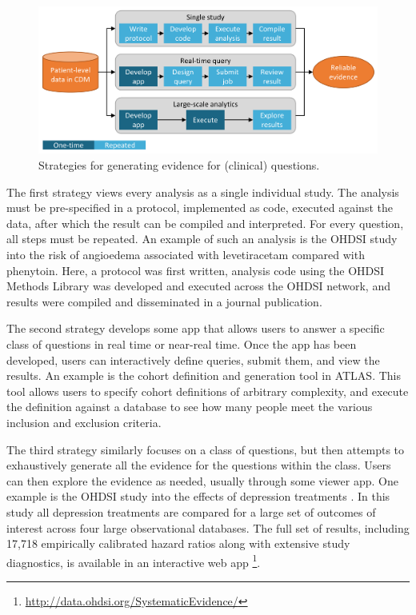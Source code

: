 \documentclass[11pt]{book}
\let\rmarkdownfootnote\footnote%
\def\footnote{\protect\rmarkdownfootnote}
\begin{document}
\begin{figure}

{\centering \includegraphics[width=0.9\linewidth]{images/OhdsiAnalyticsTools/strategies} 

}

\caption{Strategies for generating evidence for (clinical) questions.}\label{fig:strategies}
\end{figure}

The first strategy views every analysis as a single individual study.
The analysis must be pre-specified in a protocol, implemented as code,
executed against the data, after which the result can be compiled and
interpreted. For every question, all steps must be repeated. An example
of such an analysis is the OHDSI study into the risk of angioedema
associated with levetiracetam compared with phenytoin. \citep{duke_2017}
Here, a protocol was first written, analysis code using the OHDSI
Methods Library was developed and executed across the OHDSI network, and
results were compiled and disseminated in a journal publication.

The second strategy develops some app that allows users to answer a
specific class of questions in real time or near-real time. Once the app
has been developed, users can interactively define queries, submit them,
and view the results. An example is the cohort definition and generation
tool in ATLAS. This tool allows users to specify cohort definitions of
arbitrary complexity, and execute the definition against a database to
see how many people meet the various inclusion and exclusion criteria.

The third strategy similarly focuses on a class of questions, but then
attempts to exhaustively generate all the evidence for the questions
within the class. Users can then explore the evidence as needed, usually
through some viewer app. One example is the OHDSI study into the effects
of depression treatments \citep{schuemie_2018b}. In this study all
depression treatments are compared for a large set of outcomes of
interest across four large observational databases. The full set of
results, including 17,718 empirically calibrated hazard ratios along
with extensive study diagnostics, is available in an interactive web app
\footnote{\url{http://data.ohdsi.org/SystematicEvidence/}}.
\end{document}
